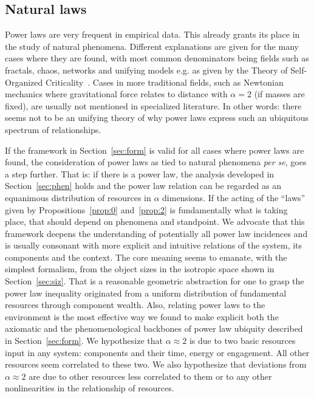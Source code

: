 \documentclass[a4paper, 11pt]{article} %
\begin{document}
\subsection{Natural laws}

Power laws are very frequent in empirical data.
This already grants its place in the study of natural phenomena.
Different explanations are given for the many cases where
they are found, with most common denominators being fields such as
fractals, chaos, networks and unifying models e.g. as given by the Theory of Self-Organized Criticality~\cite{part}.
Cases in more traditional fields, such as Newtonian mechanics where gravitational force relates to distance with $\alpha=2$ (if masses are fixed), are usually not mentioned in specialized literature.
In other words: there seems not to be an unifying theory of why power laws express such
an ubiquitous spectrum of relationships.

If the framework in Section~\ref{sec:form} is valid for all cases where power laws are found,
the consideration of power laws as tied to natural phenomena \emph{per se}, goes a step further. 
That is: if there is
a power law, the analysis developed in Section~\ref{sec:phen} holds
and
the power law relation can be regarded as an equanimous distribution
of resources in $\alpha$ dimensions.
If the acting of the ``laws'' given by Propositions~\ref{prop:0} and~\ref{prop:2} is fundamentally what is taking place, that should depend on phenomena
and standpoint.
We advocate that this framework deepens the understanding of potentially all power law
incidences and is usually consonant with more explicit and intuitive 
relations of the system, its components and the context.
The core meaning seems to emanate, with the simplest formalism, from
the object sizes in the isotropic space shown in Section~\ref{sec:siz}.
That is a reasonable geometric abstraction for
one to grasp the power law inequality originated from
a uniform distribution
of fundamental resources through component wealth.
Also, relating power laws to the environment is the most effective
way we found to make explicit both the axiomatic
and the phenomenological backbones of power law ubiquity described in
Section~\ref{sec:form}.
We hypothesize that $\alpha \approx 2$ is due to two basic resources
input in any system: components and their time, energy or engagement.
All other resources seem correlated to these two.
We also hypothesize that deviations from $\alpha \approx 2$ are due
to other resources less correlated to them
or to any other nonlinearities in the relationship of resources.
\end{document}
